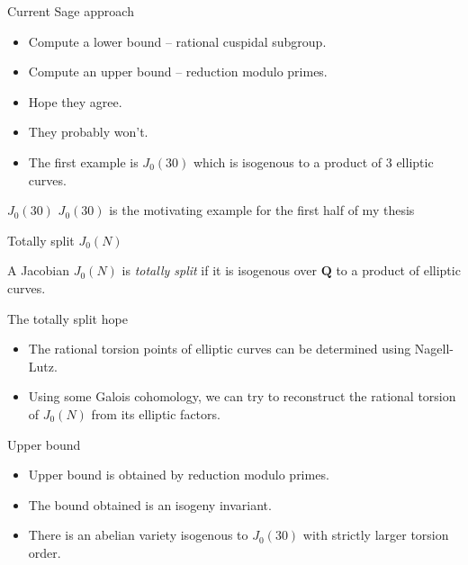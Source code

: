 \documentclass{beamer}
\newcommand{\QQ}{\mathbf{Q}}
\begin{document}
\begin{frame}{Current Sage approach}
    \begin{itemize}
        \item
            Compute a lower bound -- rational cuspidal subgroup.
        \item
            Compute an upper bound -- reduction modulo primes.
        \item
            Hope they agree.
        \item
            They probably won't.
        \item
            The first example is $J_0(30)$ which is
            isogenous to a product of 3 elliptic curves.
    \end{itemize}
\end{frame}

\begin{frame}{$J_0(30)$}
    \Large{$J_0(30)$ is the motivating example for the first half of my thesis}
\end{frame}

\begin{frame}{Totally split $J_0(N)$}
    \begin{definition}
        A Jacobian $J_0(N)$ is \emph{totally split} if it is isogenous over
        $\QQ$ to a product of elliptic curves.
    \end{definition}
\end{frame}

\begin{frame}{The totally split hope}
    \begin{itemize}
        \item
            The rational torsion points of elliptic curves can be determined
            using Nagell-Lutz.
        \item
            Using some Galois cohomology, we can try to reconstruct the
            rational torsion of $J_0(N)$ from its elliptic factors.
    \end{itemize}
\end{frame}

\begin{frame}{Upper bound}
    \begin{itemize}
        \item
            Upper bound is obtained by reduction modulo primes.
        \item
            The bound obtained is an isogeny invariant.
        \item
            There is an abelian variety isogenous to $J_0(30)$ with strictly
            larger torsion order.
    \end{itemize}
\end{frame}
\end{document}
